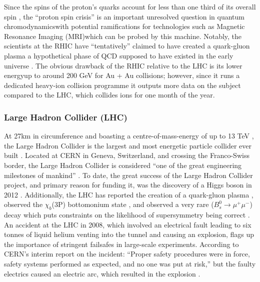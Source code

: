 Since the spins of the proton's quarks account for less than one third of its overall spin \cite{PhysLettB:ProtonSpin}, the ``proton spin crisis'' is an important unresolved question in quantum chromodynamics\textendash with potential ramifications for technologies such as Magnetic Resonance Imaging (MRI)\textendash which can be probed by this machine. Notably, the scientists at the RHIC have ``tentatively'' claimed to have created a quark-gluon plasma \cite{NucPhysA:QuarkGluon}\textendash a hypothetical phase of QCD supposed to have existed in the early universe \cite{CERN:QuarkGluonPlasma:Online}. The obvious drawback of the RHIC relative to the LHC is its lower energy\textendash up to around 200 GeV for Au + Au collisions; however, since it runs a dedicated heavy-ion collision programme it outputs more data on the subject compared to the LHC, which collides ions for one month of the year.

\subsubsection{Large Hadron Collider (LHC)}
At 27km in circumference and boasting a centre-of-mass-energy of up to 13 TeV \cite{LHC:14TeV:Online,CERN:14TeV:Online}, the Large Hadron Collider is the largest and most energetic particle collider ever built \cite{LHC:Home}. Located at CERN in Geneva, Switzerland, and crossing the Franco-Swiss border, the Large Hadron Collider is considered ``one of the great engineering milestones of mankind'' \cite{LHC:Milestone:Online}. To date, the great success of the Large Hadron Collider project, and primary reason for funding it, was the discovery of a Higgs boson in 2012 \cite{PhysLettB:Higgs:ATLAS,PhysLettB:Higgs:CMS}. Additionally, the LHC has reported the creation of a quark-gluon plasma \cite{NatGeo:QuarkGluon:Online}, observed the $\chi_{b}$(3P) bottomonium state \cite{arXiv:ATLAS:Bottomonium}, and observed a very rare ($B_{s}^{0} \rightarrow \mu^{+}\mu^{-}$) decay which puts constraints on the likelihood of supersymmetry being correct \cite{BBC:SUSY}. An accident at the LHC in 2008, which involved an electrical fault leading to six tonnes of liquid helium venting into the tunnel and causing an explosion, flags up the importance of stringent failsafes in large-scale experiments. \cite{BBC:MagnetQuench:Online} According to CERN's interim report on the incident: ``Proper safety procedures were in force, safety 
systems performed as expected, and no one was put at risk,'' but the faulty electrics caused an electric arc, which resulted in the explosion \cite{CERN:IncidentReport}.

